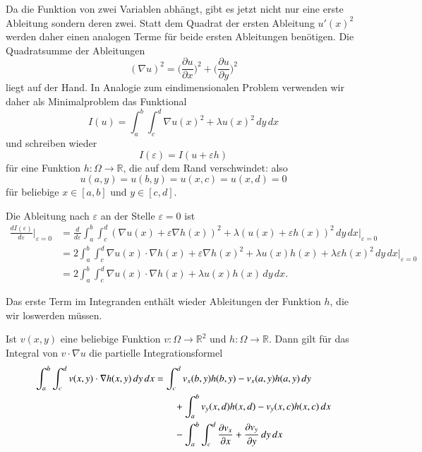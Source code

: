 Da die Funktion von zwei Variablen abhängt, gibt es jetzt nicht nur
eine erste Ableitung sondern deren zwei.
Statt dem Quadrat der ersten Ableitung $u'(x)^2$ werden daher
einen analogen Terme für beide ersten Ableitungen benötigen.
%
%
Die Quadratsumme der Ableitungen
\[
(\nabla u)^2
=
\biggl(\frac{\partial u}{\partial x}\biggr)^2
+
\biggl(\frac{\partial u}{\partial y}\biggr)^2
\]
liegt auf der Hand.
In Analogie zum eindimensionalen Problem verwenden wir daher
als Minimalproblem das Funktional
%
\[
I(u)
=
\int_a^b\int_c^d \nabla u(x)^2 + \lambda u(x)^2\,dy \,dx
\]
und schreiben wieder
\[
I(\varepsilon)
=
I(u + \varepsilon h)
\]
für eine Funktion $h\colon \Omega\to\mathbb R$, die auf dem Rand
verschwindet: also
\[
u(a,y) = u(b,y) = u(x,c) = u(x,d) = 0
\]
für beliebige $x\in[a,b]$ und $y\in[c,d]$.

Die Ableitung nach $\varepsilon$ an der Stelle $\varepsilon=0$ ist
\begin{align*}
\frac{dI(\varepsilon)}{d\varepsilon}\bigg|_{\varepsilon=0}
&=
\frac{d}{d\varepsilon}
\int_a^b\int_c^d
(\nabla u(x)+\varepsilon \nabla h(x))^2
+
\lambda (u(x) + \varepsilon h(x))^2
\,dy \,dx
\bigg|_{\varepsilon=0}
\\
&=
2
\int_a^b\int_c^d
\nabla u(x)\cdot \nabla h(x) +\varepsilon \nabla h(x)^2
+
\lambda u(x) h(x) + \lambda \varepsilon h(x)^2
\,dy \,dx
\bigg|_{\varepsilon=0}
\\
&=
2
\int_a^b\int_c^d
\nabla u(x)\cdot \nabla h(x) + \lambda u(x) h(x)
\,dy \,dx.
\end{align*}

Das erste Term im Integranden enthält wieder Ableitungen der Funktion
$h$, die wir loswerden müssen.

\begin{lemma}
\label{pde:lemma:partint2}
Ist $v(x,y)$ eine beliebige Funktion $v\colon\Omega\to\mathbb R^2$ und
$h\colon\Omega\to\mathbb R$. 
Dann gilt für das Integral von $v\cdot\nabla u$ die partielle
Integrationsformel
%
%
\begin{align}
\int_a^b\int_c^d v(x,y)\cdot \nabla h(x,y)\,dy\,dx
&=
\int_c^d
v_x(b,y) h(b,y)
-
v_x(a,y) h(a,y)
\,dy
\notag
\\
&\qquad
+
\int_a^b
v_y(x,d) h(x,d)
-
v_y(x,c) h(x,c)
\,dx
\notag
\\
&\qquad
-\int_a^b\int_c^d
\frac{\partial v_x}{\partial x}+\frac{\partial v_y}{\partial y}
\,dy\,dx
\label{pde:fem:part2d}
\end{align}
\end{lemma}

